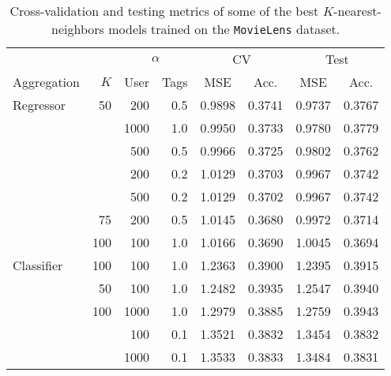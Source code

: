 \begin{table}[H]
\centering
\begin{tabular}{lrrrcccc}
\toprule
           &     & \multicolumn{2}{c}{$\alpha$} &  \multicolumn{2}{c}{CV} & \multicolumn{2}{c}{Test} \\
           \cmidrule(lr){3-4}\cmidrule(lr){5-6}\cmidrule(l){7-8}
Aggregation & $K$ & User & Tags &  MSE & Acc. & MSE & Acc.  \\
\midrule
Regressor & 50  & 200  & 0.5 &  0.9898 &      0.3741 &   0.9737 &        0.3767 \\
           &     & 1000 & 1.0 &  0.9950 &      0.3733 &   0.9780 &        0.3779 \\
           &     & 500  & 0.5 &  0.9966 &      0.3725 &   0.9802 &        0.3762 \\
           &     & 200  & 0.2 &  1.0129 &      0.3703 &   0.9967 &        0.3742 \\
           &     & 500  & 0.2 &  1.0129 &      0.3702 &   0.9967 &        0.3742 \\
           & 75  & 200  & 0.5 &  1.0145 &      0.3680 &   0.9972 &        0.3714 \\
           & 100 & 100  & 1.0 &  1.0166 &      0.3690 &   1.0045 &        0.3694 \\
Classifier & 100 & 100  & 1.0 &  1.2363 &      0.3900 &   1.2395 &        0.3915 \\
           & 50  & 100  & 1.0 &  1.2482 &      0.3935 &   1.2547 &        0.3940 \\
           & 100 & 1000 & 1.0 &  1.2979 &      0.3885 &   1.2759 &        0.3943 \\
           &     & 100  & 0.1 &  1.3521 &      0.3832 &   1.3454 &        0.3832 \\
           &     & 1000 & 0.1 &  1.3533 &      0.3833 &   1.3484 &        0.3831 \\
\bottomrule
\end{tabular}
\caption{Cross-validation and testing metrics of some of the best $K$-nearest-neighbors models trained on the \texttt{MovieLens} dataset.}
\label{tab:results.knn}
\end{table}
